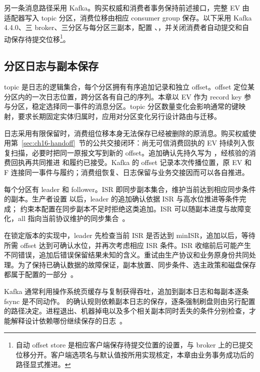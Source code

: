 另一条消息路径采用 Kafka。购买权威和消费者事务保持前述接口，完整 EV 由适配器写入 topic 分区，消费位移由相应 consumer group 保存。以下采用 Kafka 4.4.0、三 broker、三分区与每分区三副本，配置 、，并关闭消费者自动提交和自动保存待提交位移\footnote{自动 offset store 是相应客户端保存待提交位置的设置，与 broker 上的已提交位移分开。客户端选项名与默认值按所用实现核定，本章由业务事务成功后的路径显式推进。}。

\subsection{分区日志与副本保存}

topic 是日志的逻辑集合，每个分区拥有有序追加记录和独立 offset。offset 定位某分区内的一次日志位置，跨分区各有自己的序列。本章以 EV 作为 record key 参与分区，稳定选择同一事件的消息分区。topic 分区数量变化会影响通常的键映射，要求长期固定实体归属时，应用对分区变化另行设计路由与迁移。

日志采用有限保留时，消费组位移本身无法保存已经被删除的原消息。购买权威使用第~\ref{sec:ch16-handoff}~节的公共交接闭环：尚无可信消费回执的 EV 持续列入恢复扫描，必要时把同一原报文写到新的 offset。追加确认先持久写为 ，经核验的消费回执再共同推进  和履约已接受。Kafka 的 offset 记录本次传播位置，原 EV 和 F 连接同一事件与履约；消费组恢复、日志保留与业务交接因而可以各自推进。


每个分区有 leader 和 follower。ISR 即同步副本集合，维护当前达到相应同步条件的副本。生产者设置  以后，leader 的追加确认依据 ISR 与高水位推进等条件完成； 约束本配置在同步副本不足时拒绝这类追加。ISR 可以随副本进度与故障变化，all 指向当前协议维护的同步集合~\cite{kafka44-replication}。

在锁定版本的实现中，leader 先检查当前 ISR 是否达到 minISR，追加以后，等待所需 offset 达到可确认水位，并再次考虑相应 ISR 条件。ISR 收缩前后可能产生不同错误，追加后错误保留结果未知的含义。重试由生产协议和业务原身份共同处理。为了保持已确认数据的故障保证，副本放置、同步条件、选主政策和磁盘保存都属于配置的一部分~\cite{kafka44-replication}。

Kafka 通常利用操作系统页缓存与复制获得吞吐，追加到副本日志和每副本逐条 fsync 是不同动作。 的确认规则依赖副本日志的保存，逐条强制刷盘则由另行配置的路径决定。进程退出、机器掉电以及多个相关副本同时丢失的条件分别检查，才能解释设计依赖哪份继续保存的日志~\cite{kafka44-design}。

